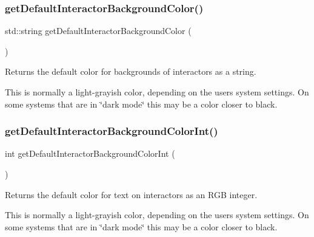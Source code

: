 \subsubsection{\texorpdfstring{get\+Default\+Interactor\+Background\+Color()}{getDefaultInteractorBackgroundColor()}}
{\footnotesize\ttfamily std\+::string get\+Default\+Interactor\+Background\+Color (\begin{DoxyParamCaption}{ }\end{DoxyParamCaption})\hspace{0.3cm}{\ttfamily [static]}}



Returns the default color for backgrounds of interactors as a string. 

This is normally a light-\/grayish color, depending on the user\textquotesingle{}s system settings. On some systems that are in \char`\"{}dark mode\char`\"{} this may be a color closer to black. \mbox{\label{classGWindow_a04e520567df471df236f1efeb5ea4d90}} 
\subsubsection{\texorpdfstring{get\+Default\+Interactor\+Background\+Color\+Int()}{getDefaultInteractorBackgroundColorInt()}}
{\footnotesize\ttfamily int get\+Default\+Interactor\+Background\+Color\+Int (\begin{DoxyParamCaption}{ }\end{DoxyParamCaption})\hspace{0.3cm}{\ttfamily [static]}}



Returns the default color for text on interactors as an R\+GB integer. 

This is normally a light-\/grayish color, depending on the user\textquotesingle{}s system settings. On some systems that are in \char`\"{}dark mode\char`\"{} this may be a color closer to black. \mbox{\label{classGWindow_aa65fc0c6ac0c5ebeafffe99e35face97}} 
